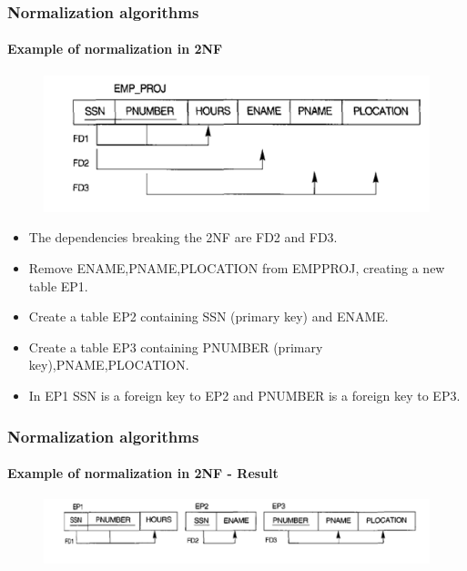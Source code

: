 \documentclass{beamer}
\begin{document}
\begin{frame}
	\frametitle{Normalization algorithms}
	\framesubtitle{Example of normalization in 2NF}
	
	\begin{figure}
		\includegraphics[scale=0.5]{img/normalization/norm15}
	\end{figure}
	
	\begin{itemize}
		\item The dependencies breaking the 2NF are FD2 and FD3.
		\item Remove ENAME,PNAME,PLOCATION from EMP\textunderscore PROJ, creating a new table EP1.
		\item Create a table EP2 containing SSN (primary key) and ENAME.
		\item Create a table EP3 containing PNUMBER (primary key),PNAME,PLOCATION.
		\item In EP1 SSN is a foreign key to EP2 and PNUMBER is a foreign key to EP3.		
	\end{itemize}
\end{frame}

\begin{frame}
	\frametitle{Normalization algorithms}
	\framesubtitle{Example of normalization in 2NF - Result}
	
	\begin{figure}
		\includegraphics[scale=0.4]{img/normalization/norm16}
	\end{figure}
\end{frame}
\end{document}
